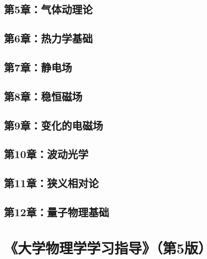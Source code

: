 \documentclass[lang=cn,color=blue,11pt]{elegantbook}
\begin{document}
\section{第5章：气体动理论}




\section{第6章：热力学基础}




\section{第7章：静电场}





\section{第8章：稳恒磁场}





\section{第9章：变化的电磁场}





\section{第10章：波动光学}





\section{第11章：狭义相对论}




\section{第12章：量子物理基础}




\chapter{《大学物理学学习指导》（第5版）}
\end{document}
